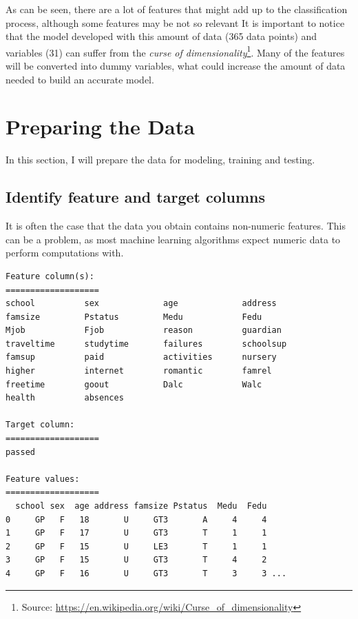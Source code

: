 \documentclass[a4paper]{article}
\begin{document}
As can be seen, there are a lot of features that might add up to the classification process, although some features may be not so relevant It is important to notice that the model developed with this amount of data (365 data points) and variables (31) can suffer from the  \textit{curse of dimensionality}\footnote{Source: \url{https://en.wikipedia.org/wiki/Curse_of_dimensionality}}. Many of the features will be converted into dummy variables, what could increase the amount of data needed to build an accurate model.


\section{Preparing the Data}
In this section, I will prepare the data for modeling, training and testing.
\subsection{Identify feature and target columns}
It is often the case that the data you obtain contains non-numeric features. This can be a problem, as most machine learning algorithms expect numeric data to perform computations with.

\begin{lstlisting}
Feature column(s):
===================
school         	sex            	age            	address        
famsize        	Pstatus        	Medu           	Fedu           
Mjob           	Fjob           	reason         	guardian       
traveltime     	studytime      	failures       	schoolsup      
famsup         	paid           	activities     	nursery        
higher         	internet       	romantic       	famrel         
freetime       	goout          	Dalc           	Walc           
health         	absences       

Target column:
===================
passed

Feature values:
===================
  school sex  age address famsize Pstatus  Medu  Fedu
0     GP   F   18       U     GT3       A     4     4
1     GP   F   17       U     GT3       T     1     1
2     GP   F   15       U     LE3       T     1     1
3     GP   F   15       U     GT3       T     4     2
4     GP   F   16       U     GT3       T     3     3 ...
\end{lstlisting}
\end{document}
